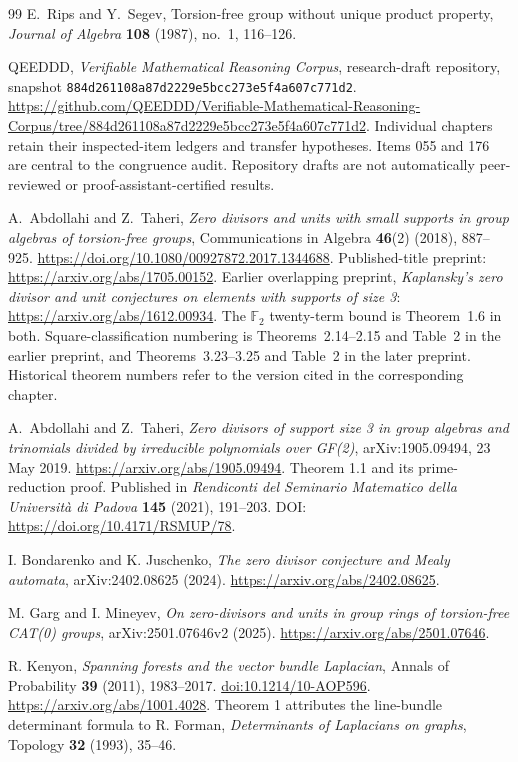 \documentclass[11pt,a4paper,oneside]{report}
\theoremstyle{definition}
\theoremstyle{remark}
\begin{document}
\begin{thebibliography}{99}
E.~Rips and Y.~Segev, Torsion-free group without unique product property,
\emph{Journal of Algebra} \textbf{108} (1987), no.~1, 116--126.

QEEDDD, \emph{Verifiable Mathematical Reasoning Corpus},
research-draft repository, snapshot
\texttt{884d261108a87d2229e5bcc273e5f4a607c771d2}.
\url{https://github.com/QEEDDD/Verifiable-Mathematical-Reasoning-Corpus/tree/884d261108a87d2229e5bcc273e5f4a607c771d2}.
Individual chapters retain their inspected-item ledgers and transfer
hypotheses. Items 055 and 176 are central to the congruence audit.
Repository drafts are not automatically peer-reviewed or
proof-assistant-certified results.

A.~Abdollahi and Z.~Taheri, \emph{Zero divisors and units
with small supports in group algebras of torsion-free groups},
Communications in Algebra \textbf{46}(2) (2018), 887--925.
\url{https://doi.org/10.1080/00927872.2017.1344688}.
Published-title preprint: \url{https://arxiv.org/abs/1705.00152}.
Earlier overlapping preprint, \emph{Kaplansky's zero divisor and unit
conjectures on elements with supports of size 3}:
\url{https://arxiv.org/abs/1612.00934}.
The $\mathbb F_2$ twenty-term bound is Theorem~1.6 in both.
Square-classification numbering is Theorems~2.14--2.15 and Table~2
in the earlier preprint, and Theorems~3.23--3.25 and Table~2
in the later preprint. Historical theorem numbers refer to the
version cited in the corresponding chapter.

A.~Abdollahi and Z.~Taheri,
\emph{Zero divisors of support size 3 in group algebras and trinomials
divided by irreducible polynomials over GF(2)},
arXiv:1905.09494, 23 May 2019.
\url{https://arxiv.org/abs/1905.09494}.
Theorem 1.1 and its prime-reduction proof. Published in
\emph{Rendiconti del Seminario Matematico della Universit\`a di Padova}
\textbf{145} (2021), 191--203.
DOI: \url{https://doi.org/10.4171/RSMUP/78}.

I. Bondarenko and K. Juschenko,
\emph{The zero divisor conjecture and Mealy automata},
arXiv:2402.08625 (2024).
\url{https://arxiv.org/abs/2402.08625}.

M. Garg and I. Mineyev,
\emph{On zero-divisors and units in group rings of torsion-free CAT(0) groups},
arXiv:2501.07646v2 (2025).
\url{https://arxiv.org/abs/2501.07646}.

R. Kenyon,
\emph{Spanning forests and the vector bundle Laplacian},
Annals of Probability \textbf{39} (2011), 1983--2017.
\href{https://doi.org/10.1214/10-AOP596}{doi:10.1214/10-AOP596}.
\url{https://arxiv.org/abs/1001.4028}.
Theorem 1 attributes the line-bundle determinant formula to R. Forman,
\emph{Determinants of Laplacians on graphs}, Topology \textbf{32} (1993), 35--46.


\end{thebibliography}
\end{document}
